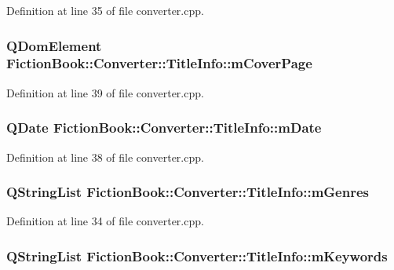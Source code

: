 Definition at line 35 of file converter.\+cpp.

\hypertarget{classConverter_1_1TitleInfo_afd5944a2140785dd5e82dd104347ea43}{
\subsubsection[{m\+Cover\+Page}]{\setlength{\rightskip}{0pt plus 5cm}Q\+Dom\+Element Fiction\+Book\+::\+Converter\+::\+Title\+Info\+::m\+Cover\+Page}}\label{classConverter_1_1TitleInfo_afd5944a2140785dd5e82dd104347ea43}


Definition at line 39 of file converter.\+cpp.

\hypertarget{classConverter_1_1TitleInfo_a61b420b8e1b57f9ca2c67a0dd99b97a9}{
\subsubsection[{m\+Date}]{\setlength{\rightskip}{0pt plus 5cm}Q\+Date Fiction\+Book\+::\+Converter\+::\+Title\+Info\+::m\+Date}}\label{classConverter_1_1TitleInfo_a61b420b8e1b57f9ca2c67a0dd99b97a9}


Definition at line 38 of file converter.\+cpp.

\hypertarget{classConverter_1_1TitleInfo_a733c254bad101a10b5f5179eb0f425ce}{
\subsubsection[{m\+Genres}]{\setlength{\rightskip}{0pt plus 5cm}Q\+String\+List Fiction\+Book\+::\+Converter\+::\+Title\+Info\+::m\+Genres}}\label{classConverter_1_1TitleInfo_a733c254bad101a10b5f5179eb0f425ce}


Definition at line 34 of file converter.\+cpp.

\hypertarget{classConverter_1_1TitleInfo_af5d2aba6b595660501f8aaeab00010f9}{
\subsubsection[{m\+Keywords}]{\setlength{\rightskip}{0pt plus 5cm}Q\+String\+List Fiction\+Book\+::\+Converter\+::\+Title\+Info\+::m\+Keywords}}\label{classConverter_1_1TitleInfo_af5d2aba6b595660501f8aaeab00010f9}


